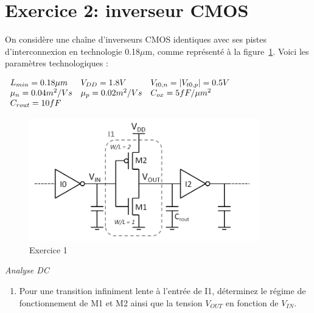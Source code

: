 \documentclass[frenchb,DIV=14]{scrartcl}
\begin{document}
\newpage
\section*{Exercice 2: inverseur CMOS}

On considère une chaîne d'inverseurs CMOS identiques avec ses pistes d'interconnexion
en technologie 0.18$\mu$m, comme représenté à la figure~\ref{fig7-2}. Voici les paramètres
technologiques :

\begin{center}
$
	\begin{array}{l l l}
		L_{min} = 0.18 \mu m 	& V_{DD} = 1.8 V 		& V_{t0,n} = |V_{t0,p} | = 0.5 V \\
		\mu_n = 0.04 m^2/Vs 	& \mu_p = 0.02 m^2/Vs	& C_{ox} = 5 fF/\mu m^2 \\
		C_{rout} = 10fF			&						& \\
	\end{array}
$
\end{center}

\begin{figure}[!htbp]
   \centering
   \includegraphics[width=10cm]{figures/fig7-2.png}
   \caption{Exercice 1}
   \label{fig7-2}
\end{figure}

\emph{Analyse DC}
\begin{enumerate}
	\item Pour une transition infiniment lente à l'entrée de I1, déterminez le régime de
	fonctionnement de M1 et M2 ainsi que la tension $V_{OUT}$ en fonction de $V_{IN}$.
\end{enumerate}
\end{document}
